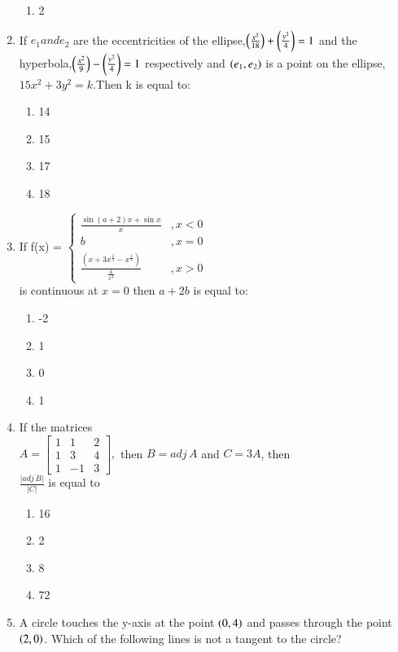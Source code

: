 \documentclass[journal,12pt,twocolumn]{IEEEtran}
\theoremstyle{remark}
\begin{document}
\begin{enumerate}
\begin{enumerate}
       \item 2
   \end{enumerate}
   \item If $e_{1} and e_{2}$ are the eccentricities of the ellipse,$\left(\frac{x^{2}}{18}\right)+\left(\frac{y^{2}}{4}\right)=1$ and the hyperbola,$\left(\frac{x^{2}}{9}\right)-\left(\frac{y^{2}}{4}\right)=1$ respectively and $\left(e_{1},e_{2}\right)$
  is a point on the ellipse,$15x^{2}+3y^{2}=k$.Then k is equal to$\colon$
   \begin{enumerate}
       \item 14
       \item 15
       \item 17
       \item 18
   \end{enumerate}
   \item If f(x) =
$\begin{cases}
\frac{\sin(a+2)x + \sin x}{x}&,x < 0 \\
b&,x = 0 \\
\frac{(x + 3x^{\frac{2}{3}} - x^{\frac{1}{3}})}{\frac{4}{x^3}}&,x > 0
\end{cases}$\\is continuous at $x=0$ then $a+2b$ is equal to$\colon$
\begin{enumerate}
    \item -2
    \item 1
    \item 0
    \item 1
\end{enumerate}
\item If the matrices\\
$A=\begin{bmatrix}
1&1&2\\1&3&4\\1&-1&3\end{bmatrix},$ then $B=adj\,A$ and $C=3A$, then\\$\frac{\lvert adj\,B \rvert}{\lvert C \rvert}$ is equal to
\begin{enumerate}
    \item 16
    \item 2
    \item 8
    \item 72
\end{enumerate}
\item A circle touches the y-axis at the point $\left(0,4\right)$ and passes through the point $\left(2,0\right)$. Which of the following lines is not a tangent to the circle?
\begin{enumerate}

\end{enumerate}
\end{enumerate}
\end{document}
